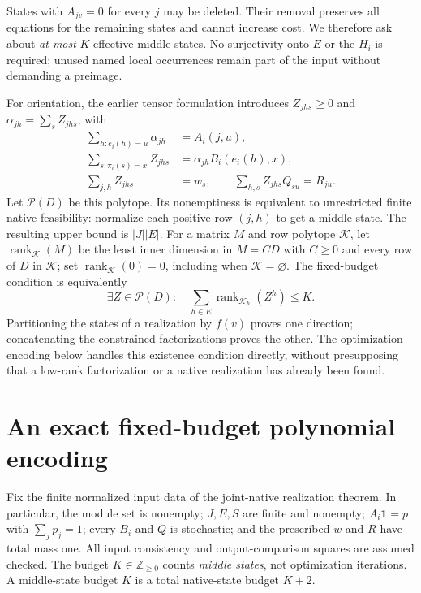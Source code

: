 \documentclass[11pt]{article}
\newcommand{\one}{\mathbf 1}
\newcommand{\Kcal}{\mathcal K}
\newcommand{\Pcal}{\mathcal P}
\newcommand{\rank}{\operatorname{rank}}
\theoremstyle{remark}
\begin{document}
States with $A_{jv}=0$ for every $j$ may be deleted. Their removal preserves all equations for the remaining states and cannot increase cost. We therefore ask about \emph{at most} $K$ effective middle states. No surjectivity onto $E$ or the $H_i$ is required; unused named local occurrences remain part of the input without demanding a preimage.

For orientation, the earlier tensor formulation introduces $Z_{jhs}\ge0$ and $\alpha_{jh}=\sum_s Z_{jhs}$, with
\begin{align}
 \sum_{h:e_i(h)=u}\alpha_{jh}&=A_i(j,u),\label{eq:tensor-root}\\
 \sum_{s:\pi_i(s)=x}Z_{jhs}&=\alpha_{jh}B_i(e_i(h),x),\label{eq:tensor-row}\\
 \sum_{j,h}Z_{jhs}&=w_s,\qquad
 \sum_{h,s}Z_{jhs}Q_{su}=R_{ju}.\label{eq:tensor-global}
\end{align}
Let $\Pcal(D)$ be this polytope. Its nonemptiness is equivalent to unrestricted finite native feasibility: normalize each positive row $(j,h)$ to get a middle state. The resulting upper bound is $|J||E|$. For a matrix $M$ and row polytope $\Kcal$, let $\rank_{\Kcal}(M)$ be the least inner dimension in $M=CD$ with $C\ge0$ and every row of $D$ in $\Kcal$; set $\rank_{\Kcal}(0)=0$, including when $\Kcal=\varnothing$. The fixed-budget condition is equivalently
\begin{equation}\label{eq:rank-budget}
 \exists Z\in\Pcal(D):\quad
 \sum_{h\in E}\rank_{\Kcal_h}(Z^h)\le K.
\end{equation}
Partitioning the states of a realization by $f(v)$ proves one direction; concatenating the constrained factorizations proves the other. The optimization encoding below handles this existence condition directly, without presupposing that a low-rank factorization or a native realization has already been found.

\section{An exact fixed-budget polynomial encoding}
\label{sec:budget-encoding}

Fix the finite normalized input data of the joint-native realization theorem.
In particular, the module set is nonempty; $J,E,S$ are finite and nonempty;
$A_i\one=p$ with $\sum_jp_j=1$; every $B_i$ and $Q$ is stochastic;
and the prescribed $w$ and $R$ have total mass one.
All input consistency and output-comparison squares are assumed checked.
The budget $K\in\mathbb Z_{\ge0}$ counts \emph{middle states}, not optimization
iterations. A middle-state budget $K$ is a total native-state budget $K+2$.
\end{document}
